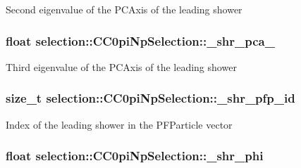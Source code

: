 Second eigenvalue of the P\-C\-Axis of the leading shower \hypertarget{classselection_1_1CC0piNpSelection_a7e5a1ac6cd32eec7da00eb45c49df0cd}{
\subsubsection[{\-\_\-shr\-\_\-pca\-\_\-2}]{\setlength{\rightskip}{0pt plus 5cm}float selection\-::\-C\-C0pi\-Np\-Selection\-::\-\_\-shr\-\_\-pca\-\_\hspace{0.3cm}{\ttfamily [private]}}}\label{classselection_1_1CC0piNpSelection_a7e5a1ac6cd32eec7da00eb45c49df0cd}
Third eigenvalue of the P\-C\-Axis of the leading shower \hypertarget{classselection_1_1CC0piNpSelection_a21f98860ef8bd0ad8d8e029a47ef6f1e}{
\subsubsection[{\-\_\-shr\-\_\-pfp\-\_\-id}]{\setlength{\rightskip}{0pt plus 5cm}size\-\_\-t selection\-::\-C\-C0pi\-Np\-Selection\-::\-\_\-shr\-\_\-pfp\-\_\-id\hspace{0.3cm}{\ttfamily [private]}}}\label{classselection_1_1CC0piNpSelection_a21f98860ef8bd0ad8d8e029a47ef6f1e}
Index of the leading shower in the P\-F\-Particle vector \hypertarget{classselection_1_1CC0piNpSelection_a8706a83b3dc2e2c3857ada556392f16f}{
\subsubsection[{\-\_\-shr\-\_\-phi}]{\setlength{\rightskip}{0pt plus 5cm}float selection\-::\-C\-C0pi\-Np\-Selection\-::\-\_\-shr\-\_\-phi\hspace{0.3cm}{\ttfamily [private]}}}\label{classselection_1_1CC0piNpSelection_a8706a83b3dc2e2c3857ada556392f16f}

